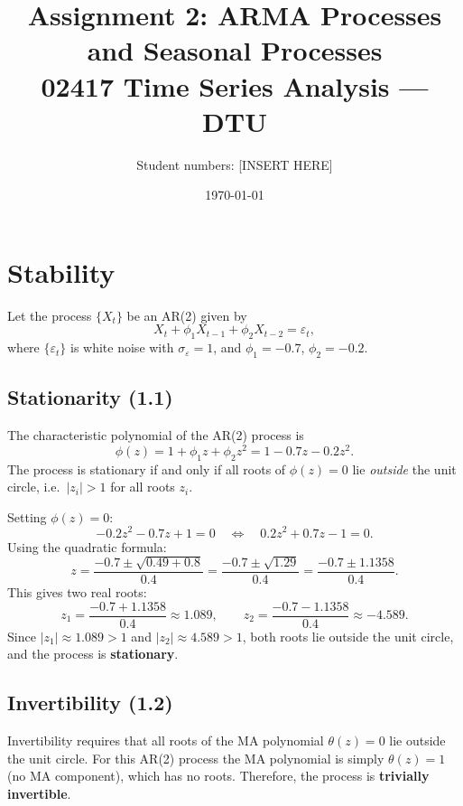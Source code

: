 \documentclass[11pt,a4paper]{article}
\title{Assignment 2: ARMA Processes and Seasonal Processes\\[4pt]
       \large 02417 Time Series Analysis --- DTU}
\author{Student numbers: [INSERT HERE]}
\date{\today}
\begin{document}
\maketitle

\section{Stability}\label{sec:stability}

Let the process $\{X_t\}$ be an AR(2) given by
\[
  X_t + \phi_1 X_{t-1} + \phi_2 X_{t-2} = \varepsilon_t,
\]
where $\{\varepsilon_t\}$ is white noise with $\sigma_\varepsilon = 1$,
and $\phi_1 = -0.7$, $\phi_2 = -0.2$.

\subsection{Stationarity (1.1)}\label{sec:stationarity}

The characteristic polynomial of the AR(2) process is
\[
  \phi(z) = 1 + \phi_1 z + \phi_2 z^2 = 1 - 0.7z - 0.2z^2.
\]
The process is stationary if and only if all roots of $\phi(z) = 0$ lie
\emph{outside} the unit circle, i.e.\ $|z_i| > 1$ for all roots $z_i$.

Setting $\phi(z) = 0$:
\[
  -0.2z^2 - 0.7z + 1 = 0 \quad\Longleftrightarrow\quad 0.2z^2 + 0.7z - 1 = 0.
\]
Using the quadratic formula:
\[
  z = \frac{-0.7 \pm \sqrt{0.49 + 0.8}}{0.4}
    = \frac{-0.7 \pm \sqrt{1.29}}{0.4}
    = \frac{-0.7 \pm 1.1358}{0.4}.
\]
This gives two real roots:
\[
  z_1 = \frac{-0.7 + 1.1358}{0.4} \approx 1.089, \qquad
  z_2 = \frac{-0.7 - 1.1358}{0.4} \approx -4.589.
\]
Since $|z_1| \approx 1.089 > 1$ and $|z_2| \approx 4.589 > 1$, both roots lie
outside the unit circle, and the process is \textbf{stationary}.

\subsection{Invertibility (1.2)}\label{sec:invertibility}

Invertibility requires that all roots of the MA polynomial $\theta(z) = 0$
lie outside the unit circle. For this AR(2) process the MA polynomial is
simply $\theta(z) = 1$ (no MA component), which has no roots. Therefore,
the process is \textbf{trivially invertible}.
\end{document}
